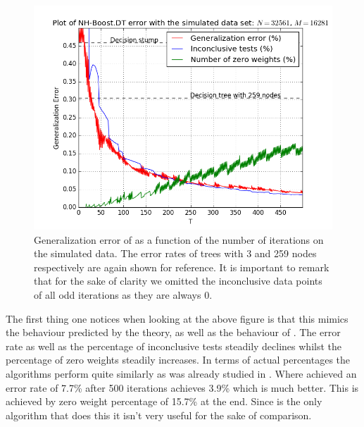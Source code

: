 \begin{figure}[!ht]
  \centering
      \includegraphics[width=\graphWidth]{generated/NHGD.png}
  \caption{Generalization error of \NHB as a function of the number of iterations on the simulated data. The error rates of trees with 3 and 259 nodes respectively are again shown for reference. It is important to remark that for the sake of clarity we omitted the inconclusive data points of all odd iterations as they are always 0.}
      \label{fig:NHBGD}
\end{figure}
 \FloatBarrier
 \par The first thing one notices when looking at the above figure is that this mimics the behaviour predicted by the theory, as well as the behaviour of \adaB. The error rate as well as the percentage of inconclusive tests steadily declines whilst the percentage of zero weights steadily increases. In terms of actual percentages the algorithms perform quite similarly as was already studied in \cite{Luo2014}. Where \adaB achieved an error rate of 7.7\% after 500 iterations \NHB achieves 3.9\% which is much better. This is achieved by zero weight percentage of 15.7\% at the end. Since \NHB is the only algorithm that does this it isn't very useful for the sake of comparison.  
